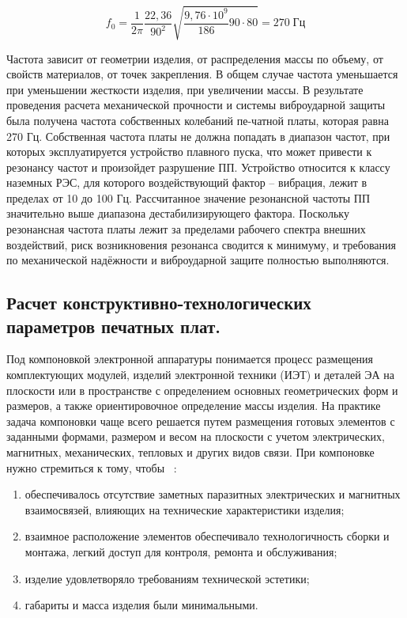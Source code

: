 $$f_0= \frac{1}{2\pi}\frac{22,36}{90^2}\sqrt{\frac{9,76 \cdot 10^9}{186} 90 \cdot 80}=270 \; Гц$$

Частота зависит от геометрии изделия, от распределения массы по
объему, от свойств материалов, от точек закрепления. В общем случае
частота уменьшается при уменьшении жесткости изделия, при увеличении
массы.  В результате проведения расчета механической прочности и
системы виброударной защиты была получена частота собственных
колебаний пе-чатной платы, которая равна 270 Гц. Собственная
частота платы не должна попадать в диапазон частот, при которых
эксплуатируется устройство плавного пуска, что может привести к
резонансу частот и произойдет разрушение ПП. Устройство относится к
классу наземных РЭС, для которого воздействующий фактор – вибрация,
лежит в пределах от 10 до 100 Гц. Рассчитанное значение резонансной
частоты ПП значительно выше диапазона дестабилизирующего фактора.
Поскольку резонансная частота платы лежит за пределами рабочего
спектра внешних воздействий, риск возникновения резонанса сводится к
минимуму, и требования по механической надёжности и виброударной
защите полностью выполняются.


\subsection{Расчет конструктивно-технологических параметров печатных плат. }

Под компоновкой электронной аппаратуры понимается процесс размещения
комплектующих модулей, изделий электронной техники (ИЭТ) и деталей ЭА
на плоскости или в пространстве с определением основных геометрических
форм и размеров, а также ориентировочное определение массы изделия.
На практике задача компоновки чаще всего решается путем размещения
готовых элементов с заданными формами, размером и весом на плоскости с
учетом электрических, магнитных, механических, тепловых и других видов
связи. При компоновке нужно стремиться к тому, чтобы ~\cite{Kostukevich2012}:
\begin{enumerate}
\item обеспечивалось отсутствие заметных паразитных электрических и магнитных взаимосвязей,
  влияющих на технические характеристики изделия;
  
\item взаимное расположение элементов обеспечивало технологичность сборки и монтажа,
  легкий доступ для контроля, ремонта и обслуживания;
  
\item изделие удовлетворяло требованиям технической эстетики;
\item габариты и масса изделия были минимальными.
\end{enumerate}

